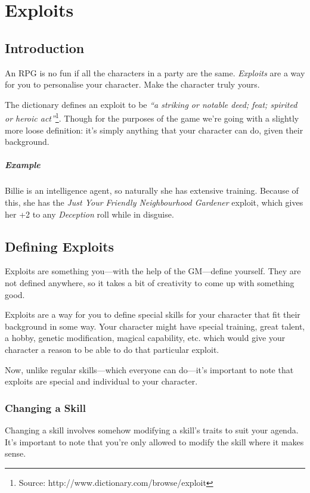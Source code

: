 \chapter{Exploits} \label{chap:exploits}
\section{Introduction}
An RPG is no fun if all the characters in a party are the same. \textit{Exploits} are a way for you to personalise your character. Make the character truly yours.

The dictionary defines an exploit to be \textit{``a striking or notable deed; feat; spirited or heroic act''}\footnote{Source: http://www.dictionary.com/browse/exploit}. 
Though for the purposes of the game we're going with a slightly more loose definition: it's simply anything that your character can do, given their background.

\paragraph{Example} Billie is an intelligence agent, so naturally she has extensive training. Because of this, she has the \textit{Just Your Friendly Neighbourhood Gardener} exploit, which gives her +2 to any \textit{Deception} roll while in disguise.

\section{Defining Exploits}

Exploits are something you---with the help of the GM---define yourself. 
They are not defined anywhere, so it takes a bit of creativity to come up with something good.

Exploits are a way for you to define special skills for your character that fit their background in some way. Your character might have special training, great talent, a hobby, genetic modification, magical capability, etc. which would give your character a reason to be able to do that particular exploit.

Now, unlike regular skills---which everyone can do---it's important to note that exploits are special and individual to your character.

\subsection{Changing a Skill}
Changing a skill involves somehow modifying a skill's traits to suit your agenda. It's important to note that you're only allowed to modify the skill where it makes sense. 
